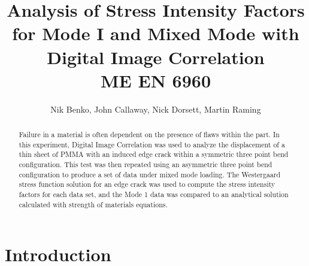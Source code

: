 \documentclass[12pt]{article}
\begin{document}
\title{ Analysis of Stress Intensity Factors for Mode I and Mixed Mode with Digital Image Correlation \\ \normalsize{ME EN 6960}}
\author{Nik Benko, John Callaway, Nick Dorsett, Martin Raming}
\maketitle


\begin{abstract} 
	Failure in a material is often dependent on the presence of flaws within the part. In this experiment, Digital Image Correlation was used to analyze the displacement of a thin sheet of PMMA with an induced edge crack within a symmetric three point bend configuration. This test was then repeated using an asymmetric three point bend configuration to produce a set of data under mixed mode loading. The Westergaard stress function solution for an edge crack was used to compute the stress intensity factors for each data set, and the Mode 1 data was compared to an analytical solution calculated with strength of materials equations. 
\end{abstract}

\section{Introduction} %
\end{document}
